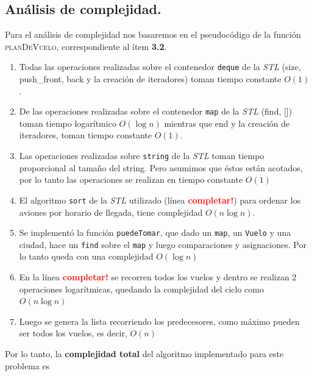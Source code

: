 \newpage
\subsection{Análisis de complejidad.}

\vspace*{0.3cm}

Para el análisis de complejidad nos basaremos en el pseudocódigo de la función
\textsc{planDeVuelo}, correspondiente al ítem \textbf{3.2}.

\begin{enumerate}
  \item Todas las operaciones realizadas sobre el contenedor \verb|deque| de la
  \textit{STL} (size, push_front, back y la creación de iteradores)
  toman tiempo constante $O(1)$.

  \item De las operaciones realizadas sobre el contenedor \verb|map| de la
  \textit{STL} (find, []) toman tiempo logarítmico $O(\log n)$ mientras que end y
  la creación de iteradores, toman tiempo constante $O(1)$.

  \item Las operaciones realizadas sobre \verb|string| de la \textit{STL} toman
  tiempo proporcional al tamaño del string. Pero asumimos que éstos están
  acotados, por lo tanto las operaciones se realizan en tiempo constante
  $O(1)$

  \item El algoritmo \verb|sort| de la \textit{STL} utilizado (línea \textcolor{red}{\textbf{completar!}})
  para ordenar los aviones por horario de llegada, tiene complejidad $O(n \log n)$.

  \item Se implementó la función \verb|puedeTomar|, que dado un \verb|map|, un \verb|Vuelo| y
    una ciudad, hace un \verb|find| sobre el \verb|map| y luego comparaciones y asignaciones.
    Por lo tanto queda con una complejidad $O(\log n)$

  \item En la línea \textcolor{red}{\textbf{completar!}} se recorren todos los vuelos
    y dentro se realizan 2 operaciones logarítmicas, quedando la complejidad del
    ciclo como $O(n \log n)$

  \item Luego se genera la lista recorriendo los predecesores, como máximo pueden ser
    todos los vuelos, es decir, $O(n)$
\end{enumerate}


Por lo tanto, la \textbf{complejidad total} del algoritmo implementado para este problema es

